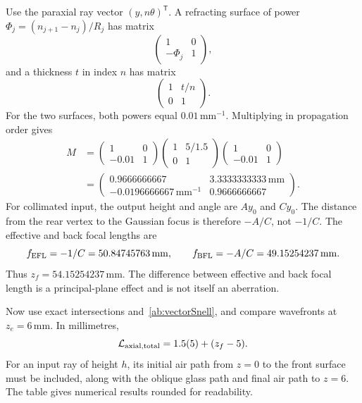Use the paraxial ray vector $(y,n\theta)^{\mathsf T}$. A refracting surface
of power $\Phi_j=(n_{j+1}-n_j)/R_j$ has matrix
\begin{equation}
 \begin{pmatrix}1&0\\-\Phi_j&1\end{pmatrix},
\end{equation}
and a thickness $t$ in index $n$ has matrix
\begin{equation}
 \begin{pmatrix}1&t/n\\0&1\end{pmatrix}.
\end{equation}
For the two surfaces, both powers equal $0.01\,\mathrm{mm}^{-1}$.
Multiplying in propagation order gives
\begin{align}
 M&=\begin{pmatrix}1&0\\-0.01&1\end{pmatrix}
    \begin{pmatrix}1&5/1.5\\0&1\end{pmatrix}
    \begin{pmatrix}1&0\\-0.01&1\end{pmatrix}\\
  &=\begin{pmatrix}
   0.9666666667&3.3333333333\,\mathrm{mm}\\
   -0.0196666667\,\mathrm{mm}^{-1}&0.9666666667
   \end{pmatrix}.
\end{align}
For collimated input, the output height and angle are $Ay_0$ and $Cy_0$.
The distance from the rear vertex to the Gaussian focus is therefore
$-A/C$, not $-1/C$. The effective and back focal lengths are
\begin{equation}
 f_{\rm EFL}=-1/C=50.84745763\,\mathrm{mm},\qquad
 f_{\rm BFL}=-A/C=49.15254237\,\mathrm{mm}.
\end{equation}
Thus $z_f=54.15254237\,\mathrm{mm}$. The difference between effective and
back focal length is a principal-plane effect and is not itself an
aberration.

Now use exact intersections and~\eqref{ab:vectorSnell}, and compare
wavefronts at $z_e=6\,\mathrm{mm}$. In millimetres,
\begin{equation}
 \mathcal L_{\rm axial,total}=1.5(5)+(z_f-5).
\end{equation}
For an input ray of height $h$, its initial air path from $z=0$ to the front
surface must be included, along with the oblique glass path and final air
path to $z=6$. The table gives numerical results rounded for readability.


